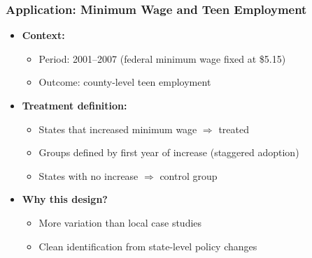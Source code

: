 \documentclass[12pt, compress]{beamer}
\begin{document}
\begin{frame}
	\frametitle{Application: Minimum Wage and Teen Employment \citep{callaway2021difference}}

\begin{itemize}
	\item \textbf{Context:}
	\begin{itemize}
		\item Period: 2001--2007 (federal minimum wage fixed at \$5.15)
		\item Outcome: county-level teen employment
	\end{itemize}
	
	\medskip
	
	\item \textbf{Treatment definition:}
	\begin{itemize}
		\item States that increased minimum wage $\Rightarrow$ treated
		\item Groups defined by first year of increase (staggered adoption)
		\item States with no increase $\Rightarrow$ control group
	\end{itemize}
	
	\medskip
	
	\item \textbf{Why this design?}
	\begin{itemize}
		\item More variation than local case studies
		\item Clean identification from state-level policy changes
	\end{itemize}
\end{itemize}

\end{frame}
\end{document}
